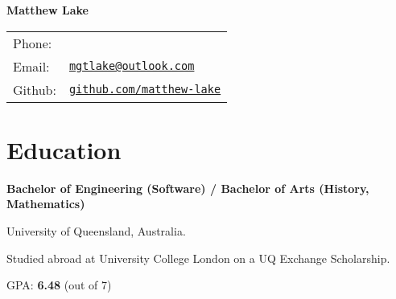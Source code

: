\documentclass[a4paper]{article}
\def\name{Matthew Lake}
\renewenvironment{itemize}{
  \begin{list}{}{
    \setlength{\leftmargin}{1.5em}
  }
}{
  \end{list}
}
\newcommand{\dateitem}[1] {\item[\textbf{#1 :}]}
\begin{document}
\centerline{\huge \bf \name}

\begin{center}
	\begin{tabular}{ll}
		Phone: 		&  \\
		Email: 		& \href{mailto:mgtlake@outlook.com}{\tt mgtlake@outlook.com} \\
		Github:		& \href{github.com/matthew-lake}{\tt github.com/matthew-lake}
	\end{tabular}
\end{center}

\section*{Education}
\begin{itemize}
	\dateitem{2014 -- 2019} {\textbf{Bachelor of Engineering (Software) /
			Bachelor of Arts (History, Mathematics)}
		
		University of Queensland, Australia.
		
		Studied abroad at University College London on a UQ Exchange Scholarship.
		
		GPA: \textbf{6.48} (out of 7)
	}
	
\end{itemize}
\end{document}
